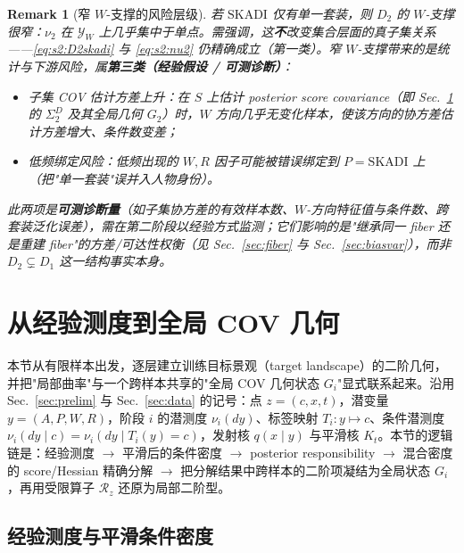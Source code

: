 \documentclass[11pt,a4paper]{article}
\newtheorem{remark}[theorem]{Remark}
\newcommand{\cY}{\mathcal{Y}}
\newcommand{\Rstr}{\mathcal{R}}     %
\begin{document}
\begin{remark}[窄 $W$-支撑的风险层级]\label{rem:s2:narrowW}
若 $\mathrm{SKADI}$ 仅有单一套装，则 $D_2$ 的 $W$-支撑很窄：$\nu_2$ 在 $\cY_W$ 上几乎集中于单点。需强调，这\textbf{不}改变集合层面的真子集关系——\eqref{eq:s2:D2skadi} 与 \eqref{eq:s2:nu2} 仍精确成立（第一类）。窄 $W$-支撑带来的是\emph{统计与下游}风险，属\textbf{第三类（经验假设 / 可测诊断）}：
\begin{itemize}
  \item \emph{子集 COV 估计方差上升}：在 $S$ 上估计 posterior score covariance（即 Sec.~\ref{sec:cov} 的 $\Sigma_2^D$ 及其全局几何 $G_2$）时，$W$ 方向几乎无变化样本，使该方向的协方差估计方差增大、条件数变差；
  \item \emph{低频绑定风险}：低频出现的 $W,R$ 因子可能被错误绑定到 $P=\mathrm{SKADI}$ 上（把"单一套装"误并入人物身份）。
\end{itemize}
此两项是\textbf{可测诊断量}（如子集协方差的有效样本数、$W$-方向特征值与条件数、跨套装泛化误差），需在第二阶段以经验方式监测；它们影响的是"继承同一 fiber 还是重建 fiber"的方差/可达性权衡（见 Sec.~\ref{sec:fiber} 与 Sec.~\ref{sec:biasvar}），而非 $D_2\subsetneq D_1$ 这一结构事实本身。
\end{remark}

\section{从经验测度到全局 COV 几何}\label{sec:cov}

本节从有限样本出发，逐层建立训练目标景观（target landscape）的二阶几何，并把"局部曲率"与一个跨样本共享的"全局 COV 几何状态 $G_i$"显式联系起来。沿用 Sec.~\ref{sec:prelim} 与 Sec.~\ref{sec:data} 的记号：点 $z=(c,x,t)$，潜变量 $y=(A,P,W,R)$，阶段 $i$ 的潜测度 $\nu_i(dy)$、标签映射 $T_i:y\mapsto c$、条件潜测度 $\nu_i(dy\mid c)=\nu_i(dy\mid T_i(y)=c)$，发射核 $q(x\mid y)$ 与平滑核 $K_t$。本节的逻辑链是：经验测度 $\to$ 平滑后的条件密度 $\to$ posterior responsibility $\to$ 混合密度的 score/Hessian 精确分解 $\to$ 把分解结果中跨样本的二阶项凝结为全局状态 $G_i$，再用受限算子 $\Rstr_z$ 还原为局部二阶型。

\subsection{经验测度与平滑条件密度}\label{subsec:s3:emp}
\end{document}
